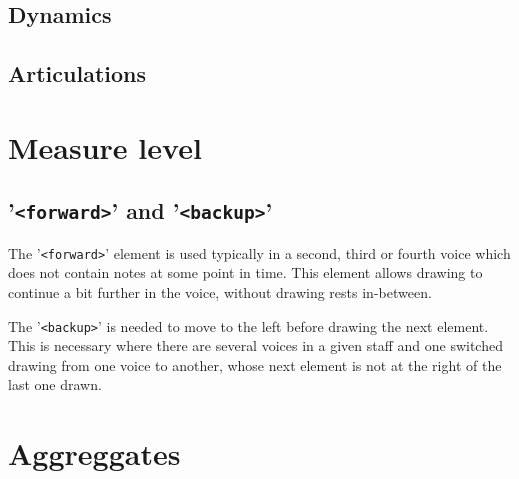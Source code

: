 \documentclass[12pt,a4paper]{article}
\begin{document}
\subsection{Dynamics}

\subsection{Articulations}

\section{Measure level}

\subsection{{'\tt <forward>}' and {'\tt <backup>}'}\label{forwardAndBackup}%

The {'\tt <forward>}' element is used typically in a second, third or fourth voice which does not contain notes at some point in time. This element allows drawing to continue a bit further in the voice, without drawing rests in-between.

The {'\tt <backup>}' is needed to move to the left before drawing the next element. This is necessary where there are several voices in a given staff and one switched drawing from one voice to another, whose next element is not at the right of the last one drawn.

\section{Aggreggates}
\end{document}
